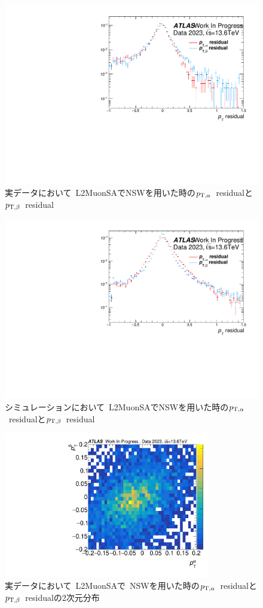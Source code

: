 \begin{figure}[H]
    \centering
    \includegraphics[clip, width=12cm]{fig/5/data_ptresidual_alpha_beta.pdf}
    \caption{実データにおいて~L2MuonSAでNSWを用いた時の$p_{\mathrm{T}, \alpha}$~residualと$p_{\mathrm{T}, \beta}$~residual}
    \label{fig:ptresidualAlphaBetaData}
\end{figure}

\begin{figure}[H]
    \centering
    \includegraphics[clip, width=12cm]{fig/5/MC_ptresidual_alpha_beta.pdf}
    \caption{シミュレーションにおいて~L2MuonSAでNSWを用いた時の$p_{\mathrm{T}, \alpha}$~residualと$p_{\mathrm{T}, \beta}$~residual}
    \label{fig:ptresidualAlphaBetaMC}
\end{figure}

\begin{figure}
    \centering
    \includegraphics[clip, width=9cm]{fig/5/ptresidual_alpha_beta_data.pdf}
    \caption{実データにおいて~L2MuonSAで~NSWを用いた時の$p_{\mathrm{T}, \alpha}$~residualと$p_{\mathrm{T}, \beta}$~residualの2次元分布}
    \label{fig:2DptresidualAlphaBetaData}
\end{figure}

